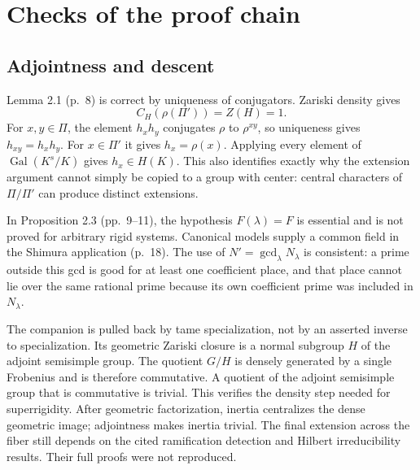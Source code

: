 \documentclass[10pt]{article}
\begin{document}
\section*{Checks of the proof chain}
\subsection*{Adjointness and descent}
Lemma 2.1 (p. 8) is correct by uniqueness of conjugators. Zariski density gives \[C_H(\rho(\Pi'))=Z(H)=1.\] For \(x,y\in\Pi\), the element \(h_xh_y\) conjugates \(\rho\) to \(\rho^{xy}\), so uniqueness gives \(h_{xy}=h_xh_y\). For \(x\in\Pi'\) it gives \(h_x=\rho(x)\). Applying every element of \(\operatorname{Gal}(K^s/K)\) gives \(h_x\in H(K)\). This also identifies exactly why the extension argument cannot simply be copied to a group with center: central characters of \(\Pi/\Pi'\) can produce distinct extensions.\par
In Proposition 2.3 (pp. 9–11), the hypothesis \(F(\lambda)=F\) is essential and is not proved for arbitrary rigid systems. Canonical models supply a common field in the Shimura application (p. 18). The use of \(N'=\gcd_\lambda N_\lambda\) is consistent: a prime outside this gcd is good for at least one coefficient place, and that place cannot lie over the same rational prime because its own coefficient prime was included in \(N_\lambda\).\par
The companion is pulled back by tame specialization, not by an asserted inverse to specialization. Its geometric Zariski closure is a normal subgroup \(H\) of the adjoint semisimple group. The quotient \(G/H\) is densely generated by a single Frobenius and is therefore commutative. A quotient of the adjoint semisimple group that is commutative is trivial. This verifies the density step needed for superrigidity. After geometric factorization, inertia centralizes the dense geometric image; adjointness makes inertia trivial. The final extension across the fiber still depends on the cited ramification detection and Hilbert irreducibility results. Their full proofs were not reproduced.\par
\end{document}
